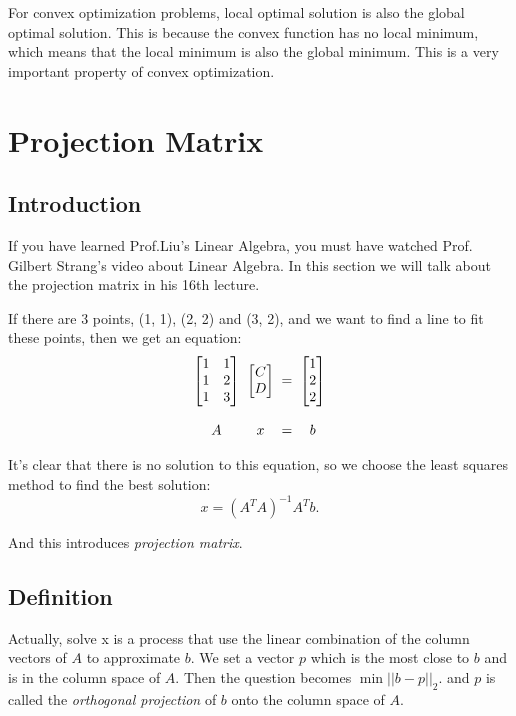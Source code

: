 \documentclass[10pt,a4paper,oneside,numbers=noenddot]{scrbook}
\theoremstyle{ctplain}
\theoremstyle{ctresult}
\begin{document}
For convex optimization problems, local optimal solution is also the global optimal solution.
This is because the convex function has no local minimum, which means that the local minimum
is also the global minimum. This is a very important property of convex optimization.

\section{Projection Matrix}

\subsection{Introduction}

If you have learned Prof.Liu's Linear Algebra, you must have watched Prof. Gilbert Strang's
video about Linear Algebra. In this section we will talk about the projection matrix in
his 16th lecture.

If there are 3 points, (1, 1), (2, 2) and (3, 2), and we want to find a line to fit these
points, then we get an equation:
\[
  \begin{array}{c@{\;\;}c@{\;\;}c@{\;\;}c}
    \begin{bmatrix}1 & 1 \\ 1 & 2 \\ 1 & 3\end{bmatrix}
    & \begin{bmatrix}C \\ D\end{bmatrix}
    & = & \begin{bmatrix}1 \\ 2 \\ 2\end{bmatrix} \\\\
    A & x & = & b
  \end{array}
\]

It's clear that there is no solution to this equation, so we choose the least squares method
to find the best solution:
\[
  x = (A^TA)^{-1}A^Tb.
\]

And this introduces \emph{projection matrix}.

\subsection{Definition}

Actually, solve x is a process that use the linear combination of the column vectors of $A$
to approximate $b$. We set a vector $p$ which is the most close to $b$ and is in the
column space of $A$. Then the question becomes $\min ||b-p||_2$. and $p$ is called the
\emph{orthogonal projection} of $b$ onto the column space of $A$.
\end{document}

